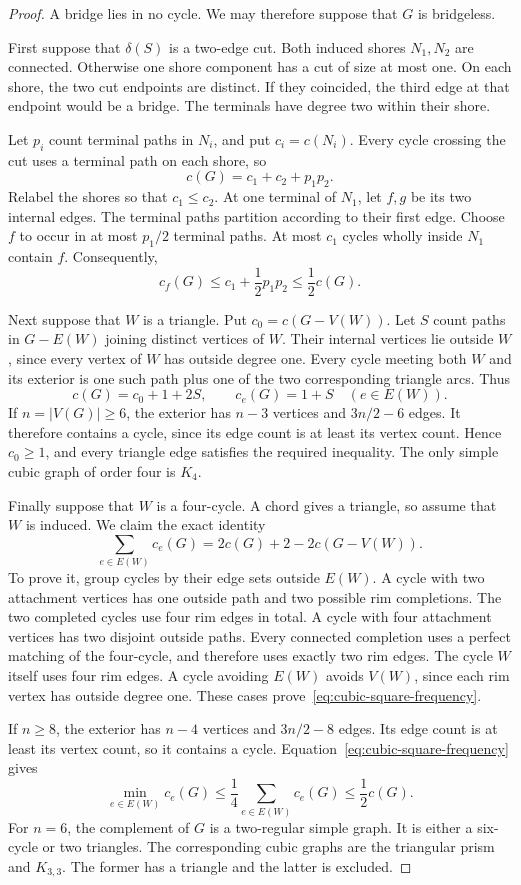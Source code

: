 \begin{proof}
A bridge lies in no cycle.
We may therefore suppose that $G$ is bridgeless.

First suppose that $\delta(S)$ is a two-edge cut.
Both induced shores $N_1,N_2$ are connected.
Otherwise one shore component has a cut of size at most one.
On each shore, the two cut endpoints are distinct.
If they coincided, the third edge at that endpoint would be a bridge.
The terminals have degree two within their shore.

Let $p_i$ count terminal paths in $N_i$, and put $c_i=c(N_i)$.
Every cycle crossing the cut uses a terminal path on each shore, so
\[
 c(G)=c_1+c_2+p_1p_2.
\]
Relabel the shores so that $c_1\le c_2$.
At one terminal of $N_1$, let $f,g$ be its two internal edges.
The terminal paths partition according to their first edge.
Choose $f$ to occur in at most $p_1/2$ terminal paths.
At most $c_1$ cycles wholly inside $N_1$ contain $f$.
Consequently,
\[
 c_f(G)\le c_1+\frac12p_1p_2\le\frac12c(G).
\]

Next suppose that $W$ is a triangle.
Put $c_0=c(G-V(W))$.
Let $S$ count paths in $G-E(W)$ joining distinct vertices of $W$.
Their internal vertices lie outside $W$, since every vertex of $W$ has outside degree one.
Every cycle meeting both $W$ and its exterior is one such path plus one of the two corresponding triangle arcs.
Thus
\[
 c(G)=c_0+1+2S,\qquad c_e(G)=1+S\quad(e\in E(W)).
\]
If $n=|V(G)|\ge6$, the exterior has $n-3$ vertices and $3n/2-6$ edges.
It therefore contains a cycle, since its edge count is at least its vertex count.
Hence $c_0\ge1$, and every triangle edge satisfies the required inequality.
The only simple cubic graph of order four is $K_4$.

Finally suppose that $W$ is a four-cycle.
A chord gives a triangle, so assume that $W$ is induced.
We claim the exact identity
\begin{equation}\label{eq:cubic-square-frequency}
 \sum_{e\in E(W)}c_e(G)=2c(G)+2-2c(G-V(W)).
\end{equation}
To prove it, group cycles by their edge sets outside $E(W)$.
A cycle with two attachment vertices has one outside path and two possible rim completions.
The two completed cycles use four rim edges in total.
A cycle with four attachment vertices has two disjoint outside paths.
Every connected completion uses a perfect matching of the four-cycle, and therefore uses exactly two rim edges.
The cycle $W$ itself uses four rim edges.
A cycle avoiding $E(W)$ avoids $V(W)$, since each rim vertex has outside degree one.
These cases prove~\eqref{eq:cubic-square-frequency}.

If $n\ge8$, the exterior has $n-4$ vertices and $3n/2-8$ edges.
Its edge count is at least its vertex count, so it contains a cycle.
Equation~\eqref{eq:cubic-square-frequency} gives
\[
 \min_{e\in E(W)}c_e(G)
 \le\frac14\sum_{e\in E(W)}c_e(G)\le\frac12c(G).
\]
For $n=6$, the complement of $G$ is a two-regular simple graph.
It is either a six-cycle or two triangles.
The corresponding cubic graphs are the triangular prism and $K_{3,3}$.
The former has a triangle and the latter is excluded.
\end{proof}


